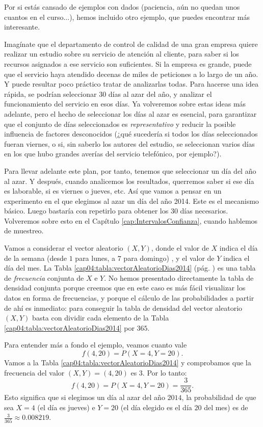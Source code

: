 \noindent Por si estás cansado de ejemplos con dados (paciencia, aún no quedan unos cuantos en el curso...), hemos incluido otro ejemplo, que puedes encontrar más interesante.
\begin{ejemplo}
\label{cap04:ejem:vectorAleatorioDias2014}
Imagínate que el departamento de control de calidad de una gran empresa quiere realizar un estudio sobre su servicio de atención al cliente, para saber si los recursos asignados a ese servicio son suficientes. Si la empresa es grande, puede que el servicio haya atendido decenas de miles de peticiones a lo largo de un año. Y puede resultar poco práctico tratar de analizarlas todas. Para hacerse una idea rápida, se podrían seleccionar $30$ días al azar del año, y analizar el funcionamiento del servicio en esos días. Ya volveremos sobre estas ideas más adelante, pero el hecho de seleccionar los días al azar es esencial, para garantizar que el conjunto de días seleccionados  es {\em representativo} y reducir la posible influencia de factores desconocidos (¿qué sucedería si todos los días seleccionados fueran viernes, o si, sin saberlo los autores del estudio, se seleccionan varios días en los que hubo grandes averías del servicio telefónico, por ejemplo?).

Para llevar adelante este plan, por tanto, tenemos que seleccionar un día del año al azar. Y después, cuando analicemos los resultados, querremos saber si ese día es laborable, si es viernes o jueves, etc.  Así que vamos a pensar en un experimento en el que elegimos al azar un día del año 2014. Este es el mecanismo básico. Luego bastaría con repetirlo para obtener los 30 días necesarios. Volveremos sobre esto en el Capítulo \ref{cap:IntervalosConfianza}, cuando hablemos de muestreo.

Vamos a considerar el vector aleatorio $(X,Y)$, donde el valor de $X$ indica el día de la semana (desde $1$ para lunes, a $7$ para domingo) , y el valor de $Y$ indica el día del mes. La Tabla \ref{cap04:tabla:vectorAleatorioDias2014} (pág. \pageref{cap04:tabla:vectorAleatorioDias2014}) es una tabla de {\em frecuencia} conjunta de $X$ e $Y$.  No hemos presentado directamente la tabla de densidad conjunta porque creemos que en este caso es más fácil visualizar los datos en forma de frecuencias, y porque el cálculo  de las probabilidades a partir de ahí es inmediato: para conseguir la tabla de densidad del vector aleatorio $(X,Y)$ basta con dividir cada elemento de la Tabla \ref{cap04:tabla:vectorAleatorioDias2014} por $365$.

Para entender más a fondo el ejemplo, veamos cuanto vale
\[f(4, 20) = P(X=4, Y=20).\]
Vamos a la Tabla \ref{cap04:tabla:vectorAleatorioDias2014} y comprobamos que la frecuencia del valor $(X,Y)=(4,20)$ es $3$. Por lo tanto:
\[f(4, 20) = P(X=4, Y=20)=\dfrac{3}{365}.\]
Esto significa que si elegimos un día al azar  del año $2014$, la probabilidad de que sea $X=4$ (el día es jueves) e $Y=20$ (el día elegido es el día $20$ del mes) es de $\frac{3}{365}\approx 0.008219$.


\end{ejemplo}
